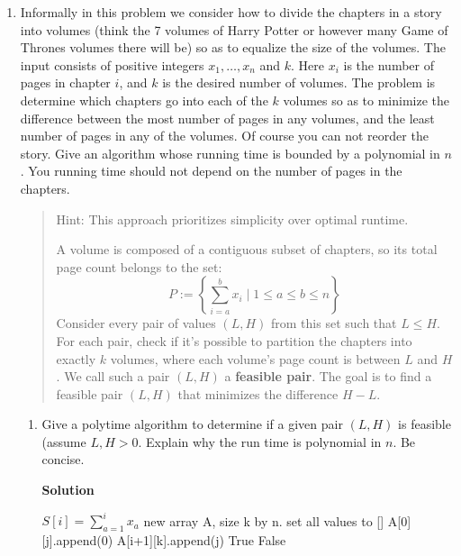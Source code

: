 \documentclass[letterpaper,12pt]{article}
\begin{document}
\begin{enumerate}
\begin{enumerate}
\end{enumerate}

\newpage


\item Informally in this problem we consider how to divide the chapters in a story into volumes (think the 7 volumes of Harry Potter
or however many Game of Thrones volumes there will be) so as to equalize the size of the volumes. 
The input consists of positive integers $x_1, \ldots, x_n$ and $k$. Here $x_i$ is the number of pages in chapter $i$, and $k$ is the desired number of volumes. The problem is determine which chapters go
into each of the $k$ volumes so as to minimize the difference between the most number of pages in
any volumes, and the least number of pages in any of the volumes. Of course you can not reorder the story. 
Give an algorithm whose running time is bounded by a  polynomial in $n$. You running time should not
depend on the number of pages in the chapters. 


\smallskip
\begin{quote}
Hint: This approach prioritizes simplicity over optimal runtime.

A volume is composed of a contiguous subset of chapters, so its total page count belongs to the set:
\[
P := \left\{ \sum_{i=a}^{b} x_i \mid 1 \le a \le b \le n \right\}
\]
Consider every pair of values $(L, H)$ from this set such that $L \le H$. For each pair, check if it's possible to partition the chapters into exactly $k$ volumes, where each volume's page count is between $L$ and $H$. We call such a pair $(L, H)$ a \textbf{feasible pair}. The goal is to find a feasible pair $(L, H)$ that minimizes the difference $H-L$. 

\end{quote}

\begin{enumerate}
\item Give a polytime algorithm to determine if a given pair $(L, H)$ is feasible (assume $L, H >0 $. Explain why the run time is polynomial in $n$. Be concise. 


\textbf{Solution}




\begin{algorithmic}[1]
    \State \(S[i] = \sum_{a=1}^i x_a\)
    \State new array A, size k by n. set all values to []
     \label{line:init}
            \State A[0][j].append(0)
        \EndIf
    \EndFor
     \label{line:startl}
                        \State A[i+1][k].append(j)
                    \EndIf
                \EndFor
            \EndIf
        \EndFor
    \EndFor\label{line:endl}
        \State \Return True
    \EndIf
    \State \Return False
\end{algorithmic}


\end{enumerate}
\end{enumerate}
\end{document}
